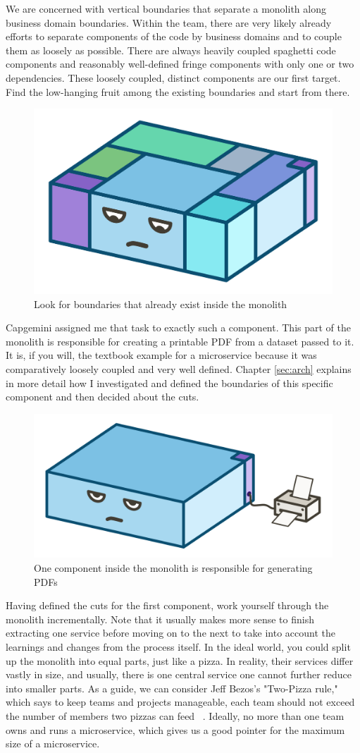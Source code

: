 We are concerned with vertical boundaries that separate a monolith along business domain boundaries. Within the team, there are very likely already efforts to separate components of the code by business domains and to couple them as loosely as possible. There are always heavily coupled spaghetti code components and reasonably well-defined fringe components with only one or two dependencies. These loosely coupled, distinct components are our first target. Find the low-hanging fruit among the existing boundaries and start from there.

\begin{figure}[ht]
  \centering
  \includegraphics[width=0.4\linewidth]{assets/illustration-monolith-boundaries.png}
  \caption{Look for boundaries that already exist inside the monolith}
\end{figure}

Capgemini assigned me that task to exactly such a component. This part of the monolith is responsible for creating a printable PDF from a dataset passed to it. It is, if you will, the textbook example for a microservice because it was comparatively loosely coupled and very well defined. Chapter \ref{sec:arch} explains in more detail how I investigated and defined the boundaries of this specific component and then decided about the cuts.

\begin{figure}[ht]
  \centering
  \includegraphics[width=0.4\linewidth]{assets/illustration-monolith-printer.png}
  \caption{One component inside the monolith is responsible for generating PDFs}
\end{figure}

Having defined the cuts for the first component, work yourself through the monolith incrementally. Note that it usually makes more sense to finish extracting one service before moving on to the next to take into account the learnings and changes from the process itself. In the ideal world, you could split up the monolith into equal parts, just like a pizza. In reality, their services differ vastly in size, and usually, there is one central service one cannot further reduce into smaller parts. As a guide, we can consider Jeff Bezos's "Two-Pizza rule," which says to keep teams and projects manageable, each team should not exceed the number of members two pizzas can feed ~\cite{hern.2018}. Ideally, no more than one team owns and runs a microservice, which gives us a good pointer for the maximum size of a microservice.


